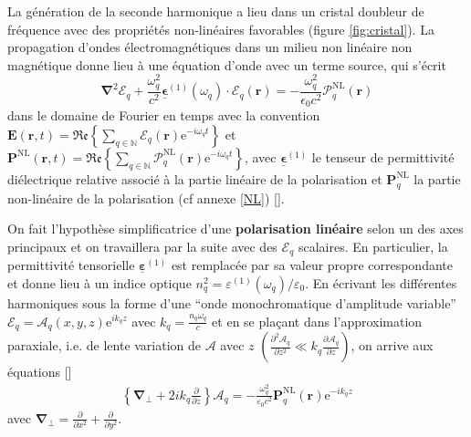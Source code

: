 \documentclass[11pt,a4paper] { article}
\newcommand{\ncite}[1]{[\citenum{#1}]}
\newcommand{\pdv}[2]{\frac{\partial #1}{\partial #2}}
\newcommand{\E}{\mathcal{E}}
\newcommand{\A}{\mathcal{A}}
\newcommand{\e}[1]{\text{e}^{#1}}
\newcommand{\mathsc}[1]{\mathrm{\scriptscriptstyle {#1}}}
\renewcommand{\v}[1]{\boldsymbol{\mathbf{#1}}}
\newcommand{\tens}[1]{\boldsymbol{\underline{#1}}}
\begin{document}
La génération de la seconde harmonique a lieu dans un cristal doubleur de fréquence avec des propriétés non-linéaires favorables (figure \ref{fig:cristal}).
La propagation d'ondes électromagnétiques dans un milieu non linéaire non magnétique donne lieu à une équation d'onde avec un terme source, qui s'écrit \[ \boldsymbol{\nabla}^2 \boldsymbol{\E}_q + \frac{\omega_q^2}{c^2}\tens\epsilon^{(1)}(\omega_q)\cdot \v \E_q(\v r) = - \frac{\omega_q^2}{\epsilon_0 c^2} \boldsymbol{\mathcal{P}}^\mathsc{NL}_q(\v r) \]
dans le domaine de Fourier en temps avec la convention $\v E(\v r, t) = \mathfrak{Re} \left\{ \sum_{q \in \mathbb N} \v {\boldsymbol{\mathcal E}}_q (\v r) \e{-i \omega_q t} \right\}$ et $\v P^\mathsc{NL} (\v r, t) = \mathfrak{Re} \left\{ \sum_{q \in \mathbb N} \v {\boldsymbol{\mathcal P}}^\mathsc{NL}_q (\v r) \e{-i \omega_q t} \right\}
$,
avec $\tens \epsilon^{(1)}$ le tenseur de permittivité diélectrique relative associé à la partie linéaire de la polarisation et $\v P^\mathsc{NL}_q$ la partie non-linéaire de la polarisation (cf annexe \ref{NL}) \ncite{boyd,joffre}.

On fait l'hypothèse simplificatrice d'une \textbf{polarisation linéaire} selon un des axes principaux et on travaillera par la suite avec des $\mathcal E_q$ scalaires. En particulier, la permittivité tensorielle $\tens \varepsilon^{(1)}$ est remplacée par sa valeur propre correspondante et donne lieu à un indice optique $\boxed{ n_q^2 = \varepsilon^{(1)}(\omega_q)/\varepsilon_0}$. En écrivant les différentes harmoniques sous la forme d'une ``onde monochromatique d'amplitude variable'' $\mathcal E_q = \A_q(x,y,z) \e{ik_qz}$ avec $\boxed{k_q =\frac{n_q \omega_q}{c}}$ et en se plaçant dans l'approximation paraxiale, i.e. de lente variation de $\A$ avec $z$ $\left(\frac{\partial^2 \A_q}{\partial z^2} \ll k_q \frac{\partial \A_q}{\partial z}\right)$, on arrive aux équations \ncite{joffre}
\begin{align}  
	\left\{\v\nabla_\bot + 2 i k_q \frac{\partial}{\partial z} \right\} \A_q = - \frac{\omega_q^2}{\varepsilon_0 c^2} \v P^\mathsc{NL}_q (\v r) \e{-ik_qz}
	\label{eq:parax}
\end{align}
avec $\v\nabla_\bot = \pdv{}{x^2} + \pdv{}{y^2}$.
\end{document}
